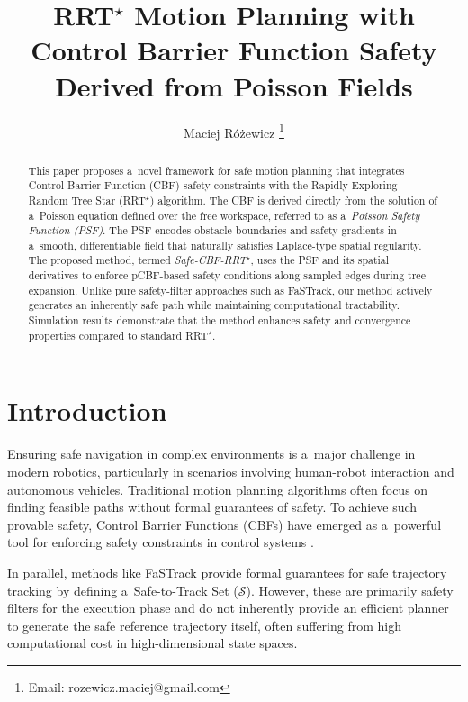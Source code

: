 \documentclass[letterpaper, 10 pt, conference]{ieeeconf}
\title{RRT$^\star$ Motion Planning with Control Barrier Function Safety Derived from Poisson Fields}
\author{Maciej Różewicz
    \thanks{Email: rozewicz.maciej@gmail.com}
}
\begin{document}
\maketitle
\thispagestyle{empty}
\pagestyle{empty}

\begin{abstract}
This paper proposes a~novel framework for safe motion planning that integrates
Control Barrier Function (CBF) safety constraints with the Rapidly-Exploring
Random Tree Star (RRT$^\star$) algorithm. The CBF is derived directly from the solution
of a~Poisson equation defined over the free workspace, referred to as
a~\emph{Poisson Safety Function (PSF)}. The PSF encodes obstacle boundaries
and safety gradients in a~smooth, differentiable field that naturally satisfies
Laplace-type spatial regularity. The proposed method, termed
\emph{Safe-CBF-RRT$^\star$}, uses the PSF and its spatial derivatives to enforce
pCBF-based safety conditions along sampled edges during tree expansion. Unlike
pure safety-filter approaches such as FaSTrack, our method actively generates an
inherently safe path while maintaining computational tractability.
Simulation results demonstrate that the method enhances safety and convergence
properties compared to standard RRT$^\star$.
\end{abstract}

\section{Introduction}
Ensuring safe navigation in complex environments is a~major challenge in modern robotics, particularly in scenarios involving human-robot interaction and autonomous vehicles. Traditional motion planning algorithms often focus on finding feasible paths without formal guarantees of safety. To achieve such provable safety, Control Barrier Functions (CBFs) have emerged as a~powerful tool for enforcing safety constraints in control systems \cite{8796030}.

In parallel, methods like FaSTrack \cite{Chen_2021} provide formal guarantees for safe trajectory tracking by defining a~Safe-to-Track Set ($\mathcal{S}$). However, these are primarily safety filters for the execution phase and do not inherently provide an efficient planner to generate the safe reference trajectory itself, often suffering from high computational cost in high-dimensional state spaces.
\end{document}
